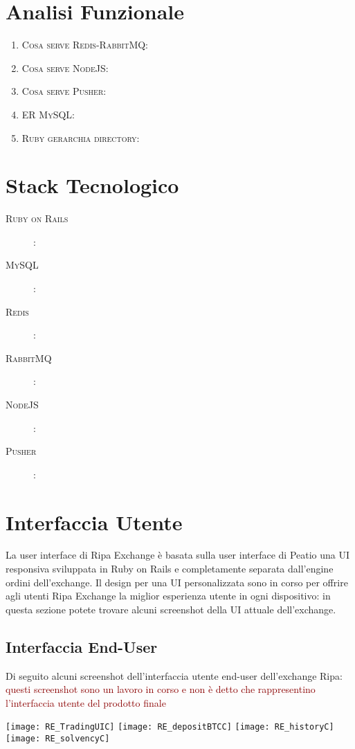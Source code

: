 \documentclass[11pt,fleqn,oneside]{book} %
\begin{document}
\section{Analisi Funzionale}
\begin{enumerate}
	\item \textsc{Cosa serve Redis-RabbitMQ}:
	\item \textsc{Cosa serve NodeJS}: 
	\item \textsc{Cosa serve Pusher}:
	\item \textsc{ER MySQL}:
	\item \textsc{Ruby gerarchia directory}:
\end{enumerate}

\section{Stack Tecnologico}
\begin{description}
	\item[\textsc{Ruby on Rails}]:
	\item[\textsc{MySQL}]: 
	\item[\textsc{Redis}]:
	\item[\textsc{RabbitMQ}]:
	\item[\textsc{NodeJS}]:
	\item[\textsc{Pusher}]:
\end{description}

\section{Interfaccia Utente}
La user interface di Ripa Exchange è basata sulla user interface di Peatio una UI responsiva sviluppata in Ruby on Rails e 
completamente separata dall'engine ordini dell'exchange.
Il design per una UI personalizzata sono in corso per offrire agli utenti Ripa Exchange la miglior esperienza utente in ogni
dispositivo: in questa sezione potete trovare alcuni screenshot della UI attuale dell'exchange.

\subsection{Interfaccia End-User}
Di seguito alcuni screenshot dell'interfaccia utente end-user dell'exchange Ripa:
\textcolor{darkred}{questi screenshot sono un lavoro in corso e non è detto che rappresentino l'interfaccia utente del prodotto finale}\\
\begin{center}
	\texttt{[image: RE\_TradingUIC]}
	\texttt{[image: RE\_depositBTCC]}
	\texttt{[image: RE\_historyC]}
	\texttt{[image: RE\_solvencyC]}
\end{center}
\end{document}
